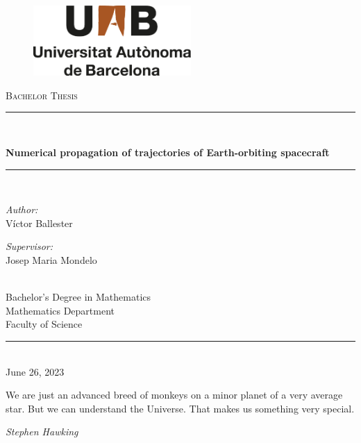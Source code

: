 \documentclass{article}
\renewcommand\title{Numerical propagation of trajectories of Earth-orbiting spacecraft}
\renewcommand\author{Víctor Ballester}
\renewcommand\date{June 26, 2023}
\newcommand\supervisor{Josep Maria Mondelo}
\newcommand\faculty{Faculty of Science}
\newcommand\department{Mathematics Department}
\newcommand\degree{Bachelor's Degree in Mathematics}
\begin{document}
\begin{titlepage}
  \begin{center}
    \vspace*{1in}
    \begin{figure}[H]
      \begin{center}
        \includegraphics[width=6cm]{Images/uab.pdf}
      \end{center}
    \end{figure}
    \vspace*{1.5cm}
    \textsc{\Large Bachelor Thesis}\\[0.75cm]
    \rule{150mm}{0.1mm}\\[0.4cm]
    {\huge \bfseries \title\par}
    \vspace{0.4cm} %
    \rule{150mm}{0.1mm} \\[1.5cm] %
    \begin{minipage}[t]{0.4\textwidth}
      \begin{flushleft} \large
        \emph{Author:}\\[0.2cm]
        \author %
      \end{flushleft}
    \end{minipage}
    \begin{minipage}[t]{0.4\textwidth}
      \begin{flushright} \large
        \emph{Supervisor:} \\[0.2cm]
        \supervisor %
      \end{flushright}
    \end{minipage}\\[3cm]
    \vfill
    {\large
      \degree\\[0.2cm]
      \department\\[0.2cm]
      \faculty\\[0.5cm]
    }
    \rule{80mm}{0.1mm}\\[0.5cm]
    {\large \date}\\[0.2cm]
    \vfill
  \end{center}
  \newpage
\end{titlepage}
\thispagestyle{empty}
\newpage
\setcounter{page}{1}
\thispagestyle{empty}
\vspace*{\fill}
\vspace{-4cm}
\epigraph{We are just an advanced breed of monkeys on a minor planet of a very average star. But we can understand the Universe. That makes us something very special.}{\textit{Stephen Hawking}}
\vspace*{\fill}
\newpage
{}
\tableofcontents
\newpage
\end{document}

